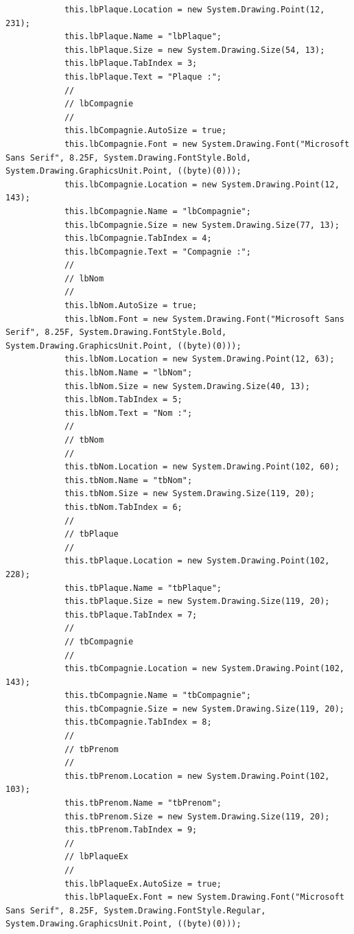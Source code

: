 \documentclass[main.tex]{subfiles}
\begin{document}
\begin{lstlisting}
            this.lbPlaque.Location = new System.Drawing.Point(12, 231);
            this.lbPlaque.Name = "lbPlaque";
            this.lbPlaque.Size = new System.Drawing.Size(54, 13);
            this.lbPlaque.TabIndex = 3;
            this.lbPlaque.Text = "Plaque :";
            // 
            // lbCompagnie
            // 
            this.lbCompagnie.AutoSize = true;
            this.lbCompagnie.Font = new System.Drawing.Font("Microsoft Sans Serif", 8.25F, System.Drawing.FontStyle.Bold, System.Drawing.GraphicsUnit.Point, ((byte)(0)));
            this.lbCompagnie.Location = new System.Drawing.Point(12, 143);
            this.lbCompagnie.Name = "lbCompagnie";
            this.lbCompagnie.Size = new System.Drawing.Size(77, 13);
            this.lbCompagnie.TabIndex = 4;
            this.lbCompagnie.Text = "Compagnie :";
            // 
            // lbNom
            // 
            this.lbNom.AutoSize = true;
            this.lbNom.Font = new System.Drawing.Font("Microsoft Sans Serif", 8.25F, System.Drawing.FontStyle.Bold, System.Drawing.GraphicsUnit.Point, ((byte)(0)));
            this.lbNom.Location = new System.Drawing.Point(12, 63);
            this.lbNom.Name = "lbNom";
            this.lbNom.Size = new System.Drawing.Size(40, 13);
            this.lbNom.TabIndex = 5;
            this.lbNom.Text = "Nom :";
            // 
            // tbNom
            // 
            this.tbNom.Location = new System.Drawing.Point(102, 60);
            this.tbNom.Name = "tbNom";
            this.tbNom.Size = new System.Drawing.Size(119, 20);
            this.tbNom.TabIndex = 6;
            // 
            // tbPlaque
            // 
            this.tbPlaque.Location = new System.Drawing.Point(102, 228);
            this.tbPlaque.Name = "tbPlaque";
            this.tbPlaque.Size = new System.Drawing.Size(119, 20);
            this.tbPlaque.TabIndex = 7;
            // 
            // tbCompagnie
            // 
            this.tbCompagnie.Location = new System.Drawing.Point(102, 143);
            this.tbCompagnie.Name = "tbCompagnie";
            this.tbCompagnie.Size = new System.Drawing.Size(119, 20);
            this.tbCompagnie.TabIndex = 8;
            // 
            // tbPrenom
            // 
            this.tbPrenom.Location = new System.Drawing.Point(102, 103);
            this.tbPrenom.Name = "tbPrenom";
            this.tbPrenom.Size = new System.Drawing.Size(119, 20);
            this.tbPrenom.TabIndex = 9;
            // 
            // lbPlaqueEx
            // 
            this.lbPlaqueEx.AutoSize = true;
            this.lbPlaqueEx.Font = new System.Drawing.Font("Microsoft Sans Serif", 8.25F, System.Drawing.FontStyle.Regular, System.Drawing.GraphicsUnit.Point, ((byte)(0)));

\end{lstlisting}
\end{document}

